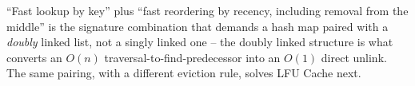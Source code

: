 \begin{takeawaybox}
``Fast lookup by key'' plus ``fast reordering by recency, including
removal from the middle'' is the signature combination that demands a
hash map paired with a \emph{doubly} linked list, not a singly linked one
-- the doubly linked structure is what converts an $O(n)$ traversal-to-find-predecessor
into an $O(1)$ direct unlink. The same pairing, with a different
eviction rule, solves LFU Cache next.
\end{takeawaybox}
